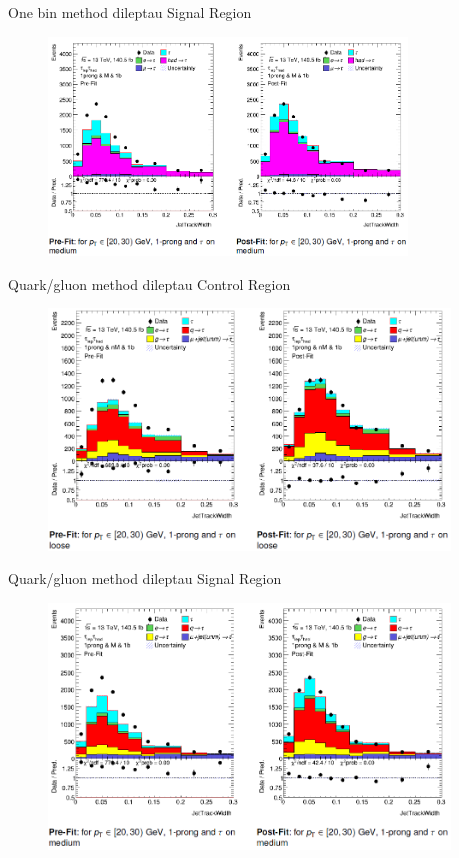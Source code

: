 \begin{frame}{One bin method dileptau Signal Region}
    \begin{figure}
        \centering
        \includegraphics[width=0.85\textwidth]{oneBinSR}
    \end{figure}
\end{frame}

\begin{frame}{Quark/gluon method dileptau Control Region}
    \begin{figure}
        \centering
        \includegraphics[width=0.95\textwidth]{quarkGluonCR}
    \end{figure}
\end{frame}

\begin{frame}{Quark/gluon method dileptau Signal Region}
    \begin{figure}
        \centering
        \includegraphics[width=0.95\textwidth]{quarkGluonSR}
    \end{figure}
\end{frame}

